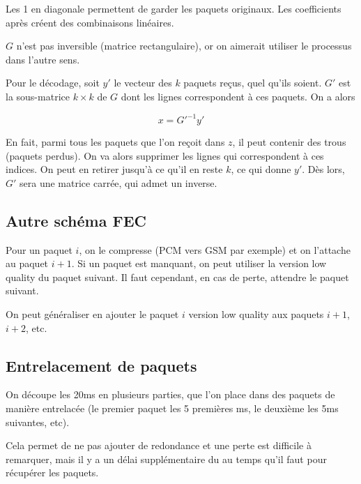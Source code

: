 			Les 1 en diagonale permettent de garder les paquets originaux. Les coefficients après créent des combinaisons linéaires.
			
			$G$ n'est pas inversible (matrice rectangulaire), or on aimerait utiliser le processus dans l'autre sens.
			
			
			Pour le décodage, soit $y'$ le vecteur des $k$ paquets reçus, quel qu'ils soient. $G'$ est la sous-matrice $k \times k$ de $G$ dont les lignes correspondent à ces paquets. On a alors
			
			$$x = G'^{-1} y'$$
			
			En fait, parmi tous les paquets que l'on reçoit dans $z$, il peut contenir des trous (paquets perdus). On va alors supprimer les lignes qui correspondent à ces indices. On peut en retirer jusqu'à ce qu'il en reste $k$, ce qui donne $y'$. Dès lors, $G'$ sera une matrice carrée, qui admet un inverse.
			
			\subsection{Autre schéma FEC}
		
	
			Pour un paquet $i$, on le compresse (PCM vers GSM par exemple) et on l'attache au paquet $i + 1$. Si un paquet est manquant, on peut utiliser la version low quality du paquet suivant. Il faut cependant, en cas de perte, attendre le paquet suivant.
			
			
			On peut généraliser en ajouter le paquet $i$ version low quality aux paquets $i + 1$, $i + 2$, etc.
			
			\subsection{Entrelacement de paquets}
			
			On découpe les 20ms en plusieurs parties, que l'on place dans des paquets de manière entrelacée (le premier paquet les 5 premières ms, le deuxième les 5ms suivantes, etc).
			
			
			Cela permet de ne pas ajouter de redondance et une perte est difficile à remarquer, mais il y a un délai supplémentaire du au temps qu'il faut pour récupérer les paquets.
			
			
			
